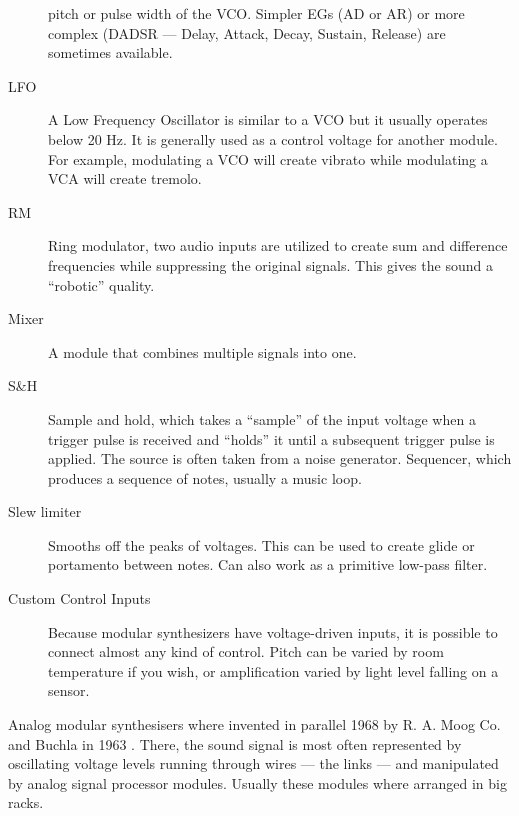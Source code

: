 \begin{mynote}
\begin{description}
    pitch or pulse width of the VCO. Simpler EGs (AD or AR) or more
    complex (DADSR --- Delay, Attack, Decay, Sustain, Release) are
    sometimes available.
  \item[LFO]  A Low Frequency
    Oscillator is similar to a VCO but it usually operates below 20
    Hz. It is generally used as a control voltage for another
    module. For example, modulating a VCO will create vibrato while
    modulating a VCA will create tremolo.
  \item[RM]  Ring modulator, two audio
    inputs are utilized to create sum and difference frequencies while
    suppressing the original signals. This gives the sound a
    ``robotic'' quality.
  \item[Mixer]  A module that combines multiple signals into one.
  \item[S\&H]  Sample and hold, which
    takes a ``sample'' of the input voltage when a trigger pulse is
    received and ``holds'' it until a subsequent trigger pulse is
    applied. The source is often taken from a noise generator.
    Sequencer, which produces a sequence of notes, usually a music
    loop.
  \item[Slew limiter]  Smooths off the peaks of
    voltages. This can be used to create glide or portamento between
    notes. Can also work as a primitive low-pass filter.
  \item[Custom Control Inputs]  Because
    modular synthesizers have voltage-driven inputs, it is possible to
    connect almost any kind of control. Pitch can be varied by room
    temperature if you wish, or amplification varied by light level
    falling on a sensor.
  \end{description}
\end{mynote}

Analog modular synthesisers where
invented in parallel 1968 by R. A. Moog Co. and Buchla in 1963
\cite{moog1964voltage}. There, the sound signal is
most often represented by oscillating voltage levels running through
wires --- the links --- and manipulated by analog signal processor
modules. Usually these modules where arranged in big racks.

